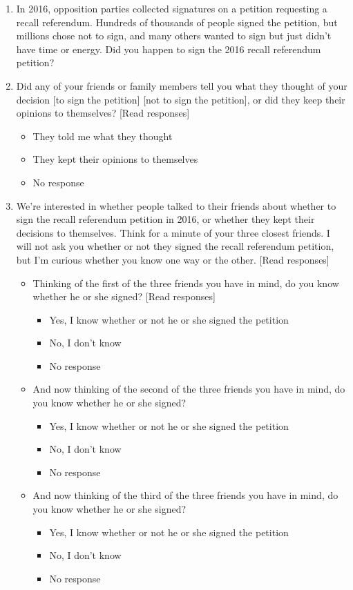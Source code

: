 \documentclass[12pt]{article}
\begin{document}
\begin{enumerate}
\item In 2016, opposition parties collected signatures on a petition requesting a recall referendum. Hundreds of thousands of people signed the petition, but millions chose not to sign, and many others wanted to sign but just didn't have time or energy. Did you happen to sign the 2016 recall referendum petition?
\item Did any of your friends or family members tell you what they thought of your decision [to sign the petition] [not to sign the petition], or did they keep their opinions to themselves? [Read responses]
\begin{itemize}
\item They told me what they thought
\item They kept their opinions to themselves
\item No response
\end{itemize}
\item We're interested in whether people talked to their friends about whether to sign the recall referendum petition in 2016, or whether they kept their decisions to themselves. Think for a minute of your three closest friends. I will not ask you whether or not they signed the recall referendum petition, but I'm curious whether you know one way or the other. [Read responses]
\begin{itemize}
\item Thinking of the first of the three friends you have in mind, do you know whether he or she signed? [Read responses]
\begin{itemize}
\item Yes, I know whether or not he or she signed the petition
\item No, I don't know
\item No response
\end{itemize}
\end{itemize}
\begin{itemize}
\item And now thinking of the second of the three friends you have in mind, do you know whether he or she signed?
\begin{itemize}
\item Yes, I know whether or not he or she signed the petition
\item No, I don't know
\item No response
\end{itemize}
\end{itemize}
\begin{itemize}
\item And now thinking of the third of the three friends you have in mind, do you know whether he or she signed?
\begin{itemize}
\item Yes, I know whether or not he or she signed the petition
\item No, I don't know
\item No response
\end{itemize}
\end{itemize}
\end{enumerate}
\end{document}
